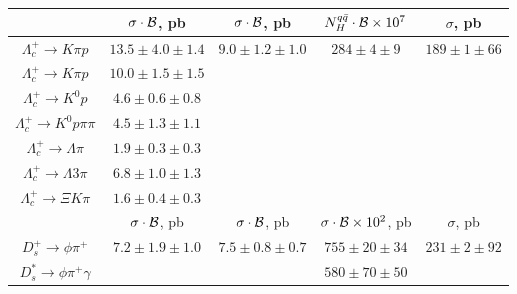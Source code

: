 {\begin{table}[hbpt]
\begin{tabular}{|c|c|c|c|c|}
\hline\hline
       & $\sigma \cdot {\cal B}$, pb & $\sigma \cdot {\cal B}$, pb& $N^{q\bar{q}}_{H} \cdot {\cal B} \times {10^{7}}$&$\sigma$, pb  \\
\hline\hline


$\Lambda_c^+\rightarrow K\pi p$         &$13.5\pm 4.0\pm 1.4$\!\cite{Bortoletto:1988kw}&$9.0 \pm 1.2 \pm 1.0$\!\cite{Albrecht:1988an} & $284\pm4\pm9$\!\cite{Aubert:2006cp} &$189\pm 1 \pm 66$\!\cite{Seuster:2005tr}  \\
$\Lambda_c^+\rightarrow K\pi p$         &$10.0 \pm 1.5 \pm 1.5$\!\cite{Avery:1990bc}   &                                              &                                             &                                                \\
$\Lambda_c^+\rightarrow K^0 p$          &$4.6 \pm 0.6 \pm 0.8$\!\cite{Avery:1990bc}    &                                              &                                             &                                                \\
$\Lambda_c^+\rightarrow K^0 p \pi \pi$  &$4.5 \pm 1.3 \pm 1.1$\!\cite{Avery:1990bc}    &                                              &                                             &                                                \\
$\Lambda_c^+\rightarrow \Lambda \pi$    &$1.9 \pm 0.3 \pm 0.3$\!\cite{Avery:1990bc}    &                                              &                                             &                                                \\
$\Lambda_c^+\rightarrow \Lambda 3\pi$   &$6.8 \pm 1.0 \pm 1.3$\!\cite{Avery:1990bc}    &                                              &                                             &                                               \\
$\Lambda_c^+\rightarrow \Xi K \pi $     &$1.6 \pm 0.4 \pm 0.3$\!\cite{Avery:1990bc}    &                                              &                                             &                                                \\\hline\hline
       & $\sigma \cdot {\cal B}$, pb & $\sigma \cdot {\cal B}$, pb& $\sigma \cdot {\cal B}\times 10^2$, pb&$\sigma$, pb  \\
\hline\hline


$D^+_s\rightarrow \phi\pi^+$            &$7.2\pm 1.9\pm 1.0$\!\cite{Bortoletto:1988kw} &$7.5 \pm 0.8 \pm 0.7$\!\cite{Albrecht:1991pa} &$755\pm 20\pm 34$\!\cite{Aubert:2002ue} &$231\pm 2\pm 92$\!\cite{Seuster:2005tr} \\\hline
$D^{*}_{s}\rightarrow \phi\pi^+\gamma$  &                                                &                                                &$580\pm 70\pm 50$\!\cite{Aubert:2002ue}    &                                                \\\hline



\end{tabular}
\end{table}}
